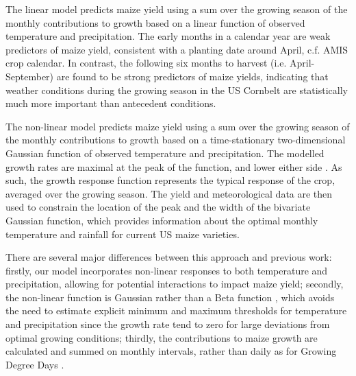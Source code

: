 \documentclass[12pt]{article}
\begin{document}
The linear model predicts maize yield using a sum over the growing season of the monthly contributions to growth based on a linear function of observed temperature and precipitation. The early months in a calendar year are weak predictors of maize yield, consistent with a planting date around April, c.f. AMIS crop calendar. In contrast, the following six months to harvest (i.e. April-September) are found to be strong predictors of maize yields, indicating that weather conditions during the growing season in the US Cornbelt are statistically much more important than antecedent conditions.

The non-linear model predicts maize yield using a sum over the growing season of the monthly contributions to growth based on a time-stationary two-dimensional Gaussian function of observed temperature and precipitation. The modelled growth rates are maximal at the peak of the function, and lower either side \citep[c.f.][]{cutforth:1990, wang:1998,  streck:2007, hatfield:2015, korres:2016, tigchelaar:2018}. As such, the growth response function represents the typical response of the crop, averaged over the growing season. The yield and meteorological data are then used to constrain the location of the peak and the width of the bivariate Gaussian function, which provides information about the optimal monthly temperature and rainfall for current US maize varieties.

There are several major differences between this approach and previous work: firstly, our model incorporates non-linear responses to both temperature and precipitation, allowing for potential interactions to impact maize yield; secondly, the non-linear function is Gaussian rather than a Beta function \citep[e.g.][]{yin:1995, streck:2007}, which avoids the need to estimate explicit minimum and maximum thresholds for temperature and precipitation since the growth rate tend to zero for large deviations from optimal growing conditions; thirdly, the contributions to maize growth are calculated and summed on monthly intervals, rather than daily as for Growing Degree Days \citep[e.g.][]{zhou:2018}.
\end{document}
